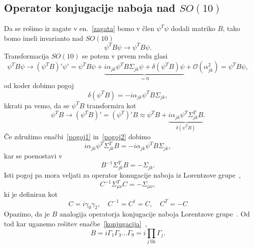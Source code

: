 \subsection{Operator konjugacije naboja nad $SO(10)$}

Da se rešimo iz zagate v en.~\eqref{zagata} bomo v člen $\psi^T\psi$ dodali matriko $B$, tako bomo
imeli invarianto nad $SO(10)$
\begin{equation}
	\psi^T B\psi \to \psi^TB\psi.
\end{equation}
Transformacija $SO(10)$ se potem v prvem redu glasi
\begin{equation}
	\psi^TB\psi \to (\psi^TB)'\psi' = \psi^TB\psi + \underbrace{i\alpha_{jk}\psi^TB\Sigma_{jk}\psi +
		\delta(\psi^T B)\psi}_{= 0} + \mathcal{O}(\alpha_{jk}^2) = \psi^TB\psi,
\end{equation}
od koder dobimo pogoj
\begin{equation}
	\delta(\psi^TB) = -i\alpha_{jk}\psi^T B\Sigma_{jk},
	\label{pogoj1}
\end{equation}
hkrati pa vemo, da se $\psi^TB$ transformira kot
\begin{equation}
	\psi^TB \to (\psi^TB)' = (\psi^T)'B \approx \psi^TB +
		\underbrace{i\alpha_{jk}\psi^T\Sigma_{jk}^T B}_{\delta(\psi^TB)}.
	\label{pogoj2}
\end{equation}
Če združimo enačbi~\eqref{pogoj1} in~\eqref{pogoj2} dobimo
\begin{equation}
	i\alpha_{jk}\psi^T\Sigma_{jk}^TB = -i\alpha_{jk}\psi^TB\Sigma_{jk},
\end{equation}
kar se poenostavi v
\begin{equation}
	B^{-1}\Sigma_{jk}^TB = -\Sigma_{jk}.
	\label{konjugacija}
\end{equation}
Isti pogoj pa mora veljati za operator konugacije naboja iz Lorentzove grupe~\cite{palash},
\begin{equation}
	C^{-1}\Sigma_{\mu\nu}^TC = -\Sigma_{\mu\nu},
\end{equation}
ki je definiran kot
\begin{equation}
	C = i\gamma_0\gamma_2,\quad C^{-1} = C^\dagger = C, \quad C^T = -C
\end{equation}
Opazimo, da je $B$ analogija operatorja konjugacije naboja Lorentzove grupe~\cite{mohapatra}.
Od tod kar uganemo rešitev enačbe~\eqref{konjugacija}~\cite{mohapatra},
\begin{equation}
	B = i\Gamma_1\Gamma_3\ldots\Gamma_9 = i\prod_{j\ \text{lih}}\Gamma_j.
\end{equation}

